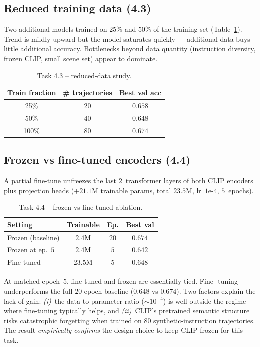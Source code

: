 \documentclass[10pt, twocolumn]{article}
\begin{document}
\subsection{Reduced training data (4.3)}
Two additional models trained on $25$\% and $50$\% of the training set
(Table~\ref{tab:reduced}). Trend is mildly upward but the model
saturates quickly --- additional data buys little additional accuracy.
Bottlenecks beyond data quantity (instruction diversity, frozen CLIP,
small scene set) appear to dominate.

\begin{table}[ht]\centering\small
\caption{Task 4.3 -- reduced-data study.}
\begin{tabular}{ccc}\toprule
Train fraction & \# trajectories & Best val acc \\\midrule
25\% & 20 & $0.658$ \\
50\% & 40 & $0.648$ \\
100\% & 80 & $\mathbf{0.674}$ \\\bottomrule
\end{tabular}
\label{tab:reduced}
\end{table}

\subsection{Frozen vs fine-tuned encoders (4.4)}
A partial fine-tune unfreezes the last $2$~transformer layers of both
CLIP encoders plus projection heads ($+21.1$M trainable params, total
$23.5$M, lr~$1$e-4, $5$~epochs).

\begin{table}[ht]\centering\small
\caption{Task 4.4 -- frozen vs fine-tuned ablation.}
\begin{tabular}{lccc}\toprule
Setting & Trainable & Ep. & Best val \\\midrule
Frozen (baseline) & $2.4$M & $20$ & $\mathbf{0.674}$ \\
Frozen at ep.~$5$ & $2.4$M & $5$  & $0.642$ \\
Fine-tuned & $23.5$M & $5$ & $0.648$ \\\bottomrule
\end{tabular}
\label{tab:ft}
\end{table}

At matched epoch~$5$, fine-tuned and frozen are essentially tied. Fine-
tuning underperforms the full $20$-epoch baseline ($0.648$ vs $0.674$).
Two factors explain the lack of gain: \emph{(i)}~the data-to-parameter
ratio ($\sim\!10^{-4}$) is well outside the regime where fine-tuning
typically helps, and \emph{(ii)}~CLIP's pretrained semantic structure
risks catastrophic forgetting when trained on $80$ synthetic-instruction
trajectories. The result \emph{empirically confirms} the design choice
to keep CLIP frozen for this task.
\end{document}
